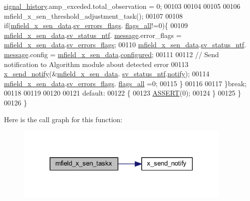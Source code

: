 \begin{DoxyCode}
      \hyperlink{a00019_ab7038f4de1f77b52a7f89e9f77c0b846}{signal\_history}.amp\_exceded.total\_observation   = 0;
00103 
00104 
00105 
00106              mfield\_x\_sen\_threshold\_adjustment\_task();
00107 
00108             \textcolor{keywordflow}{if}(\hyperlink{a00052_af8c531b1ba5fea148fb9111e06058f92}{mfield\_x\_sen\_data}.\hyperlink{a00025_aaeec6b0609dba31393f337abf1cce3d3}{sv\_errors\_flags}.
      \hyperlink{a00022_a1caa87b00c878186140c3bac9c8acf3b}{flags\_all}!=0)\{
00109              \hyperlink{a00052_af8c531b1ba5fea148fb9111e06058f92}{mfield\_x\_sen\_data}.\hyperlink{a00025_a752b00333ec308e07c6bd41aa9a01e73}{sv\_status\_ntf}.
      \hyperlink{a00019_a946af134546e64739ccfd37633480dc2}{message}.error\_flags = \hyperlink{a00052_af8c531b1ba5fea148fb9111e06058f92}{mfield\_x\_sen\_data}.\hyperlink{a00025_aaeec6b0609dba31393f337abf1cce3d3}{sv\_errors\_flags};
00110              \hyperlink{a00052_af8c531b1ba5fea148fb9111e06058f92}{mfield\_x\_sen\_data}.\hyperlink{a00025_a752b00333ec308e07c6bd41aa9a01e73}{sv\_status\_ntf}.
      \hyperlink{a00019_a946af134546e64739ccfd37633480dc2}{message}.config = \hyperlink{a00052_af8c531b1ba5fea148fb9111e06058f92}{mfield\_x\_sen\_data}.\hyperlink{a00025_a94b2d1f6ea4ab334c74d24984dd27843}{configured};
00111 
00112              \textcolor{comment}{// Send notification to Algorithm module about detected error}
00113              \hyperlink{a00036_ae17b0bb16da3c471bb6074bb4c4d0fee}{x\_send\_notify}(&\hyperlink{a00052_af8c531b1ba5fea148fb9111e06058f92}{mfield\_x\_sen\_data}.
      \hyperlink{a00025_a752b00333ec308e07c6bd41aa9a01e73}{sv\_status\_ntf}.\hyperlink{a00019_a8e6a04c2283f9fd7b8dcbc62faba5847}{notify});
00114              \hyperlink{a00052_af8c531b1ba5fea148fb9111e06058f92}{mfield\_x\_sen\_data}.\hyperlink{a00025_aaeec6b0609dba31393f337abf1cce3d3}{sv\_errors\_flags}.
      \hyperlink{a00022_a1caa87b00c878186140c3bac9c8acf3b}{flags\_all} =0;
00115             \}
00116 
00117         \}\textcolor{keywordflow}{break};
00118 
00119 
00120 
00121         \textcolor{keywordflow}{default}:
00122         \{
00123             \hyperlink{a00072_abb8ff8e213ac9f6fb21d2b968583b936}{ASSERT}(0);
00124         \}
00125     \}
00126 \}
\end{DoxyCode}


Here is the call graph for this function\+:\nopagebreak
\begin{figure}[H]
\begin{center}
\leavevmode
\includegraphics[width=296pt]{d1/d84/a00052_a72e9235043dc4a8469143a6eb48bf117_cgraph}
\end{center}
\end{figure}




